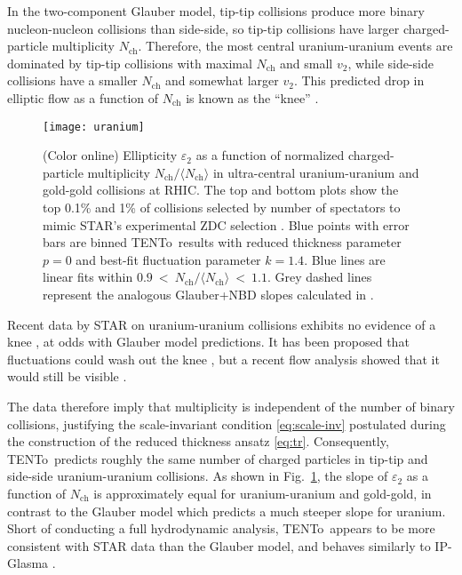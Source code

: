 \documentclass[aps,prc,reprint,amsmath,noeprint]{revtex4-1}
\newcommand{\trento}{T\raisebox{-.5ex}{R}ENTo}
\newcommand{\avg}[1]{\langle #1 \rangle}
\newcommand{\nch}{N_\text{ch}}
\begin{document}
In the two-component Glauber model, tip-tip collisions produce more binary nucleon-nucleon collisions than side-side, so tip-tip collisions have larger charged-particle multiplicity $\nch$.
Therefore, the most central uranium-uranium events are dominated by tip-tip collisions with maximal $\nch$ and small $v_2$, while side-side collisions have a smaller $\nch$ and somewhat larger $v_2$.
This predicted drop in elliptic flow as a function of $\nch$ is known as the ``knee'' \cite{Voloshin:2010ut}.

\begin{figure}[t]
  \centering
  \texttt{[image: uranium]}
  \caption{
    \label{fig:uranium}
    (Color online)
    Ellipticity $\varepsilon_2$ as a function of normalized charged-particle multiplicity $\nch/\avg\nch$ in ultra-central uranium-uranium and gold-gold collisions at RHIC.
    The top and bottom plots show the top 0.1\% and 1\% of collisions selected by number of spectators to mimic STAR's experimental ZDC selection \cite{FortheSTAR:2013bza}.
    Blue points with error bars are binned \protect\trento\ results with reduced thickness parameter $p = 0$ and best-fit fluctuation parameter $k = 1.4$.
    Blue lines are linear fits within $0.9~<~\nch/\avg\nch~<~1.1$.
    Grey dashed lines represent the analogous Glauber+NBD slopes calculated in \cite{FortheSTAR:2013bza}.
  }
\end{figure}

Recent data by STAR on uranium-uranium collisions exhibits no evidence of a knee \cite{FortheSTAR:2013bza,Wang:2014qxa}, at odds with Glauber model predictions.
It has been proposed that fluctuations could wash out the knee \cite{Rybczynski:2012av}, but a recent flow analysis showed that it would still be visible \cite{Goldschmidt:2015qya}.

The data therefore imply that multiplicity is independent of the number of binary collisions, justifying the scale-invariant condition \eqref{eq:scale-inv} postulated during the construction of the reduced thickness ansatz \eqref{eq:tr}.
Consequently, \trento\ predicts roughly the same number of charged particles in tip-tip and side-side uranium-uranium collisions.
As shown in Fig.~\ref{fig:uranium}, the slope of $\varepsilon_2$ as a function of $\nch$ is approximately equal for uranium-uranium and gold-gold, in contrast to the Glauber model which predicts a much steeper slope for uranium.
Short of conducting a full hydrodynamic analysis, \trento\ appears to be more consistent with STAR data than the Glauber model, and behaves similarly to IP-Glasma \cite{Schenke:2014tga}.
\end{document}
